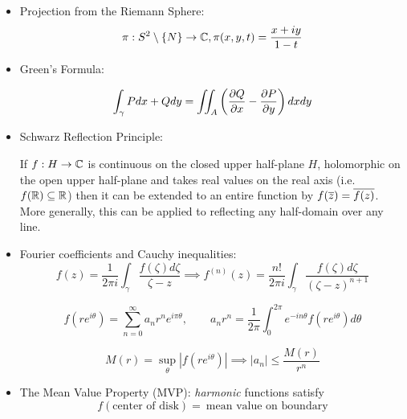 \documentclass{article}
\begin{document}
\begin{itemize}

  \item Projection from the Riemann Sphere:
  \begin{equation}
    \pi: S^2 \setminus \{N\} \to \mathbb{C}, \pi(x, y, t) = \frac{x + iy}{1 - t}
  \end{equation}

  \item Green's Formula:
  \begin{theorem}
    \begin{equation}
      \int_\gamma Pdx + Qdy
      = \iint_A\left({\frac{\partial {Q}}{\partial {x}}} - {\frac{\partial {P}}{\partial {y}}}\right)dxdy
    \end{equation}
  \end{theorem}

  \item Schwarz Reflection Principle:
  \begin{theorem}
    If \(f: H \to \mathbb{C}\) is continuous on the closed upper half-plane \(H\), holomorphic on the open upper half-plane and takes real values on the real axis (i.e. \(f(\mathbb{R}) \subseteq \mathbb{R}\)) then it can be extended to an entire function by \(f(\overline{z}) = \overline{f(z)}\). More generally, this can be applied to reflecting any half-domain over any line.
  \end{theorem}

  \item Fourier coefficients and Cauchy inequalities:
  \begin{equation}
    f(z) = \frac{1}{2\pi i}\int_\gamma\frac{f(\zeta)d\zeta}{\zeta - z} \implies f^{(n)}(z) = \frac{n!}{2\pi i}\int_\gamma\frac{f(\zeta)d\zeta}{(\zeta - z)^{n + 1}}
  \end{equation}

  \begin{equation}
    f(re^{i\theta}) = \sum_{n = 0}^\infty a_nr^ne^{i\pi\theta}, \qquad a_nr^n = \frac{1}{2\pi}\int_0^{2\pi}e^{-in\theta}f(re^{i\theta})d\theta
  \end{equation}

  \begin{equation}
    M(r) = \sup_\theta|f(re^{i\theta})| \implies |a_n| \leq \frac{M(r)}{r^n}
  \end{equation}

  \item The Mean Value Property (MVP): \textit{harmonic} functions satisfy
  \begin{equation}
    f(\text{center of disk}) = \ \text{mean value on boundary}
  \end{equation}


\end{itemize}
\end{document}
